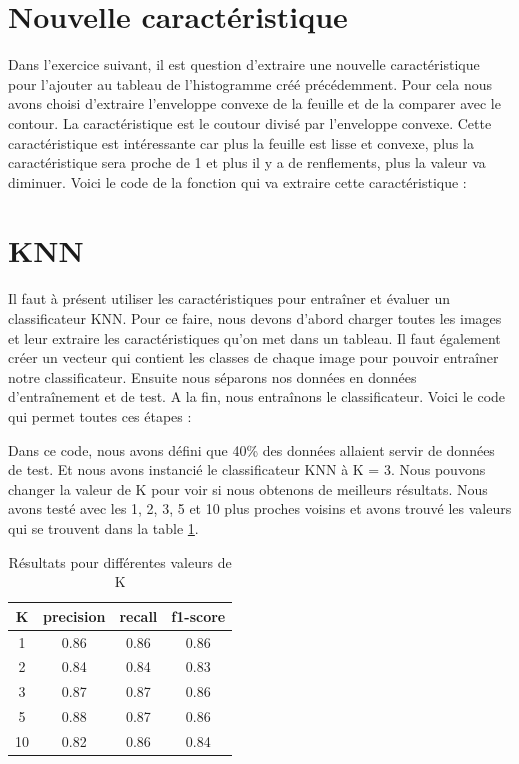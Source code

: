 \section{Nouvelle caractéristique}

Dans l'exercice suivant, il est question d'extraire une nouvelle caractéristique pour l'ajouter au tableau de l'histogramme créé précédemment. Pour cela nous avons choisi d'extraire l'enveloppe convexe de la feuille et de la comparer avec le contour. La caractéristique est le coutour divisé par l'enveloppe convexe. Cette caractéristique est intéressante car plus la feuille est lisse et convexe, plus la caractéristique sera proche de 1 et plus il y a de renflements, plus la valeur va diminuer. Voici le code de la fonction qui va extraire cette caractéristique : 




\section{KNN}

Il faut à présent utiliser les caractéristiques pour entraîner et évaluer un classificateur KNN. Pour ce faire, nous devons d'abord charger toutes les images et leur extraire les caractéristiques qu'on met dans un tableau. Il faut également créer un vecteur qui contient les classes de chaque image pour pouvoir entraîner notre classificateur. Ensuite nous séparons nos données en données d'entraînement et de test. A la fin, nous entraînons le classificateur. Voici le code qui permet toutes ces étapes : 



Dans ce code, nous avons défini que 40\% des données allaient servir de données de test. Et nous avons instancié le classificateur KNN à K = 3. Nous pouvons changer la valeur de K pour voir si nous obtenons de meilleurs résultats. Nous avons testé avec les 1, 2, 3, 5 et 10 plus proches voisins et avons trouvé les valeurs qui se trouvent dans la table \ref{valuestabforKNN}.

\begin{table}[h]
  \centering
  \footnotesize
  \begin{tabular}{|c|c|c|c|}  
    \hline
    K & precision & recall & f1-score \\
    \hline
    1 & 0.86 & 0.86 & 0.86 \\
    2 & 0.84 & 0.84 & 0.83 \\
    3 & 0.87 & 0.87 & 0.86 \\
    \rowcolor{very-light-gray}
    5 & 0.88 & 0.87 & 0.86 \\
    10 & 0.82 & 0.86 & 0.84 \\
    \hline
  \end{tabular}
  \label{valuestabforKNN}
  \caption{Résultats pour différentes valeurs de K}
\end{table}


